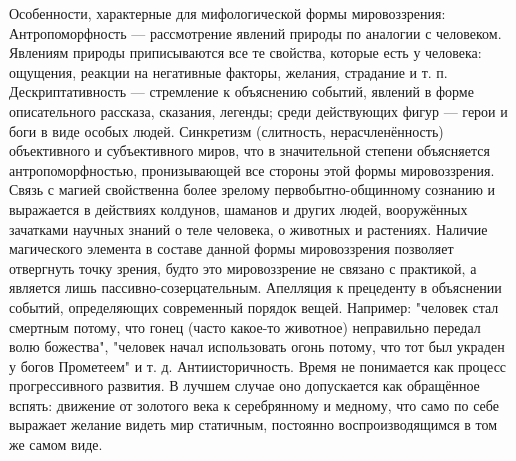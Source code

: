 \documentclass[12pt]{article}
\begin{document}
Особенности, характерные для мифологической формы мировоззрения:
Антропоморфность --- рассмотрение  явлений  природы  по  аналогии  с  человеком.  Явлениям  природы
приписываются все те свойства, которые есть у человека: ощущения, реакции на негативные факторы, желания,
страдание и т. п. 
Дескриптативность --- стремление к объяснению событий, явлений в форме описательного рассказа, сказания,
легенды; среди действующих фигур --- герои и боги в виде особых людей. 
Синкретизм (слитность, нерасчленённость) объективного и субъективного миров, что в значительной степени
объясняется антропоморфностью, пронизывающей все стороны этой формы мировоззрения. 
Связь  с  магией  свойственна  более  зрелому  первобытно-общинному  сознанию  и  выражается  в  действиях
колдунов, шаманов и других людей, вооружённых зачатками научных знаний о теле человека, о животных и
растениях. Наличие магического элемента в составе данной формы мировоззрения позволяет отвергнуть точку
зрения, будто это мировоззрение не связано с практикой, а является лишь пассивно-созерцательным. 
Апелляция  к  прецеденту  в  объяснении  событий,  определяющих  современный  порядок  вещей.  Например:
"человек стал смертным потому, что гонец (часто какое-то животное) неправильно передал волю божества",
"человек начал использовать огонь потому, что тот был украден у богов Прометеем" и т. д. 
Антиисторичность.  Время  не  понимается  как  процесс  прогрессивного  развития.  В  лучшем  случае  оно
допускается как обращённое вспять: движение от золотого века к серебрянному и медному, что само по себе
выражает желание видеть мир статичным, постоянно воспроизводящимся в том же самом виде. 

\newpage
\end{document}
